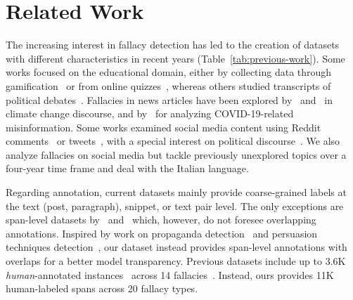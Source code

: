 \section{Related Work}
\label{sec:related-work}

The increasing interest in fallacy detection has led to the creation of datasets with different characteristics in recent years (Table~\ref{tab:previous-work}). 
Some works focused on the educational domain, either by collecting data through gamification~\citep{habernal-etal-2017-argotario,habernal-etal-2018-adapting} or from online quizzes~\citep{jin-etal-2022-logical}, whereas others studied transcripts of political debates~\citep{goffredo2022fallacious,goffredo-etal-2023-argument}. Fallacies in news articles have been explored by~\citet{jin-etal-2022-logical} and~\citet{alhindi-etal-2022-multitask} in climate change discourse, and by~\citet{musi2022developing} for analyzing COVID-19-related misinformation. 
Some works examined social media content using Reddit comments~\citep{habernal-etal-2018-name,sahai-etal-2021-breaking} or tweets~\citep{sheng-etal-2021-nice}, with a special interest on political discourse~\citep{macagno2022argumentation,shultz-2024-entity}.
We also analyze fallacies on social media but tackle previously unexplored topics over a four-year time frame and deal with the Italian language. 

Regarding annotation, current datasets mainly provide coarse-grained labels at the text (post, paragraph), snippet, or text pair level. The only exceptions are span-level datasets by~\citet{sahai-etal-2021-breaking} and~\citet{goffredo-etal-2023-argument} which, however, do not foresee overlapping annotations. Inspired by work on propaganda detection~\citep{da-san-martino-etal-2019-findings,da-san-martino-etal-2019-fine,da-san-martino-etal-2020-semeval} and persuasion techniques detection~\citep{piskorski-etal-2023-multilingual}, our dataset instead provides span-level annotations with overlaps for a better model transparency. Previous datasets include up to 3.6K \emph{human}-annotated instances~\citep{habernal-etal-2018-name} across 14 fallacies~\citep{goffredo2022fallacious}. Instead, ours provides 11K human-labeled spans across 20 fallacy types.

